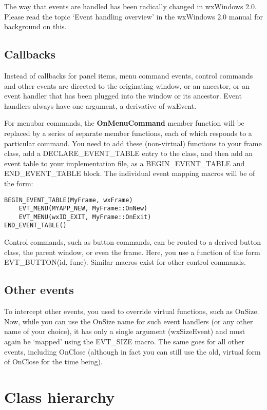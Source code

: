The way that events are handled has been radically changed in wxWindows 2.0. Please
read the topic `Event handling overview' in the wxWindows 2.0 manual for background
on this.

\section{Callbacks}

Instead of callbacks for panel items, menu command events, control commands and other events are directed to
the originating window, or an ancestor, or an event handler that has been plugged into the window
or its ancestor. Event handlers always have one argument, a derivative of wxEvent.

For menubar commands, the {\bf OnMenuCommand} member function will be replaced by a series of separate member functions,
each of which responds to a particular command. You need to add these (non-virtual) functions to your
frame class, add a DECLARE\_EVENT\_TABLE entry to the class, and then add an event table to
your implementation file, as a BEGIN\_EVENT\_TABLE and END\_EVENT\_TABLE block. The
individual event mapping macros will be of the form:

\begin{verbatim}
BEGIN_EVENT_TABLE(MyFrame, wxFrame)
    EVT_MENU(MYAPP_NEW, MyFrame::OnNew)
    EVT_MENU(wxID_EXIT, MyFrame::OnExit)
END_EVENT_TABLE()
\end{verbatim}

Control commands, such as button commands, can be routed to a derived button class,
the parent window, or even the frame. Here, you use a function of the form EVT\_BUTTON(id, func).
Similar macros exist for other control commands.

\section{Other events}

To intercept other events, you used to override virtual functions, such as OnSize. Now, while you can use
the OnSize name for such event handlers (or any other name of your choice), it has only a single argument
(wxSizeEvent) and must again be `mapped' using the EVT\_SIZE macro. The same goes for all other events,
including OnClose (although in fact you can still use the old, virtual form of OnClose for the time being).

\chapter{Class hierarchy}\label{classhierarchy}

